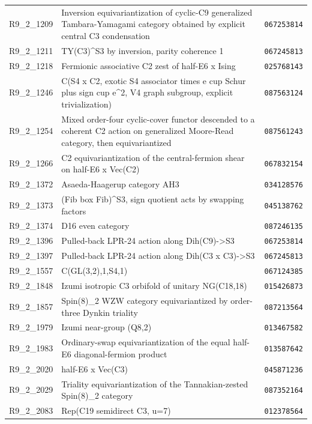 \begin{small}
\begin{longtable}{p{}p{}p{}}
R9\_2\_1209 & Inversion equivariantization of cyclic-C9 generalized Tambara-Yamagami category obtained by explicit central C3 condensation & \texttt{067253814}\\
R9\_2\_1211 & TY(C3)\textasciicircum{}S3 by inversion, parity coherence 1 & \texttt{067245813}\\
R9\_2\_1218 & Fermionic associative C2 zest of half-E6 x Ising & \texttt{025768143}\\
R9\_2\_1246 & C(S4 x C2, exotic S4 associator times e cup Schur plus sign cup e\textasciicircum{}2, V4 graph subgroup, explicit trivialization) & \texttt{087563124}\\
R9\_2\_1254 & Mixed order-four cyclic-cover functor descended to a coherent C2 action on generalized Moore-Read category, then equivariantized & \texttt{087561243}\\
R9\_2\_1266 & C2 equivariantization of the central-fermion shear on half-E6 x Vec(C2) & \texttt{067832154}\\
R9\_2\_1372 & Asaeda-Haagerup category AH3 & \texttt{034128576}\\
R9\_2\_1373 & (Fib box Fib)\textasciicircum{}S3, sign quotient acts by swapping factors & \texttt{045138762}\\
R9\_2\_1374 & D16 even category & \texttt{087246135}\\
R9\_2\_1396 & Pulled-back LPR-24 action along Dih(C9)->S3 & \texttt{067253814}\\
R9\_2\_1397 & Pulled-back LPR-24 action along Dih(C3 x C3)->S3 & \texttt{067245813}\\
R9\_2\_1557 & C(GL(3,2),1,S4,1) & \texttt{067124385}\\
R9\_2\_1848 & Izumi isotropic C3 orbifold of unitary NG(C18,18) & \texttt{015426873}\\
R9\_2\_1857 & Spin(8)\_2 WZW category equivariantized by order-three Dynkin triality & \texttt{087213564}\\
R9\_2\_1979 & Izumi near-group (Q8,2) & \texttt{013467582}\\
R9\_2\_1983 & Ordinary-swap equivariantization of the equal half-E6 diagonal-fermion product & \texttt{013587642}\\
R9\_2\_2020 & half-E6 x Vec(C3) & \texttt{045871236}\\
R9\_2\_2029 & Triality equivariantization of the Tannakian-zested Spin(8)\_2 category & \texttt{087352164}\\
R9\_2\_2083 & Rep(C19 semidirect C3, u=7) & \texttt{012378564}\\
\bottomrule\end{longtable}\end{small}
